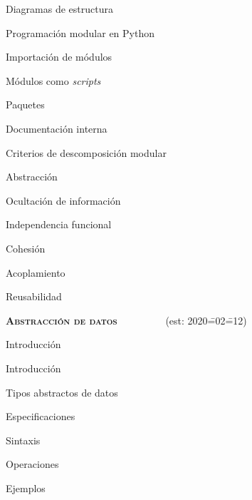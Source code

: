 \begin{longenum}
\begin{longenum}
\begin{longenum}
\begin{longenum}
            \end{longenum}
            \item Diagramas de estructura
            \item Programación modular en Python
            \begin{longenum}
                \item Importación de módulos
                \item Módulos como \textit{scripts}
                \item Paquetes \opcional\
                \item Documentación interna \opcional\
            \end{longenum}
        \end{longenum}
        \item Criterios de descomposición modular
        \begin{longenum}
            \item Abstracción
            \item Ocultación de información
            \item Independencia funcional
            \begin{longenum}
                \item Cohesión
                \item Acoplamiento
            \end{longenum}
            \item Reusabilidad
        \end{longenum}
    \end{longenum}
    \item \textbf{\textsc{Abstracción de datos}} \ \ \ \ \ \ \ \ \ (est: 2020\==02\==12)
    \begin{longenum}
        \item Introducción
        \begin{longenum}
            \item Introducción
            \item Tipos abstractos de datos
        \end{longenum}
        \item Especificaciones
        \begin{longenum}
            \item Sintaxis
            \item Operaciones
            \item Ejemplos
        \end{longenum}

\end{longenum}
\end{longenum}
